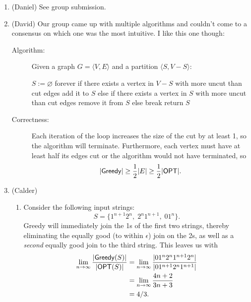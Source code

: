 \documentclass{article}
\def\eps{\epsilon}
\def\nil{\varnothing}
\def\G{{\sf Greedy}\xspace}
\def\O{{\sf OPT}\xspace}
\begin{document}
\noindent
\begin{center}
\end{center}\vspace{0em}


\begin{enumerate}


\item (Daniel) See group submission.


\item (David) Our group came up with multiple algorithms and couldn't come to a consensus on which one was the most intuitive. I like this one though:
\begin{description}

\item[Algorithm:]
Given a graph $G = \langle V, E \rangle$ and a partition $\langle S, V-S \rangle$:
\begin{code}
$S := \nil$
forever
   if there exists a vertex in $V-S$ with more uncut than cut edges
      add it to $S$
   else if there exists a vertex in $S$ with more uncut than cut edges
      remove it from $S$
   else
      break
return $S$
\end{code}

\item[Correctness:]
Each iteration of the loop increases the size of the cut by at least 1, so the algorithm will terminate. Furthermore, each vertex must have at least half its edges cut or the algorithm would not have terminated, so
$$|\G| \geq \frac{1}{2} |E| \geq \frac{1}{2} |\O|.$$

\end{description}


\item (Calder)
\begin{enumerate}

\item
Consider the following input strings:
$$S = \{
	1^{n+1} 2^n,\;
	2^n 1^{n+1},\;
	0 1^n
\}.$$
\G will immediately join the 1s of the first two strings, thereby eliminating the equally good (to within $\eps$) join on the 2s, as well as a {\it second} equally good join to the third string. This leaves us with
\begin{align}
	\lim_{n \rightarrow \infty} \dfrac{|\G(S)|}{|\O(S)|}
	&= \lim_{n \rightarrow \infty} \dfrac{|0 1^n 2^n 1^{n+1} 2^n|}{|0 1^{n+1} 2^n 1^{n+1}|} \notag\\
	&= \lim_{n \rightarrow \infty} \dfrac{4n + 2}{3n + 3} \notag\\
	&= 4/3. \notag
\end{align}


\end{enumerate}
\end{enumerate}
\end{document}
